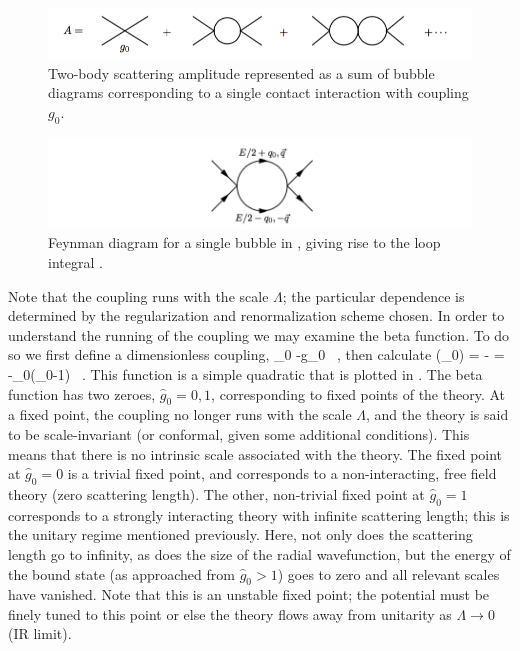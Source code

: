 \begin{figure}
\caption{\label{fig:bubblesum}Two-body scattering amplitude represented as a sum of bubble diagrams corresponding to a single contact interaction with coupling $g_0$.}
\includegraphics[width=\linewidth]{Chapter5-figures/simple1}
\end{figure}

\begin{figure}
\caption{\label{fig:loop}Feynman diagram for a single bubble in , giving rise to the loop integral .}
\includegraphics[width=\linewidth]{Chapter5-figures/loop1}
\end{figure}

Note that the coupling runs with the scale $\Lambda$; the particular dependence is determined by the regularization and renormalization scheme chosen. In order to understand the running of the coupling we may examine the beta function. To do so we first define a dimensionless coupling,
\beq
{}_0 \equiv -g_0 \ ,
\eeq
then calculate
\beq
\label{eq:beta}
\beta\left(_0\right) \equiv \Lambda {} = - = -_0\left(_0-1\right) \ .
\eeq
This function is a simple quadratic that is plotted in . The beta function has two zeroes, $\hat{g}_0 = 0,1$, corresponding to fixed points of the theory. At a fixed point, the coupling no longer runs with the scale $\Lambda$, and the theory is said to be scale-invariant (or conformal, given some additional conditions). This means that there is no intrinsic scale associated with the theory. The fixed point at $\hat{g}_0=0$ is a trivial fixed point, and corresponds to a non-interacting, free field theory (zero scattering length). The other, non-trivial fixed point at $\hat{g}_0=1$ corresponds to a strongly interacting theory with infinite scattering length; this is the unitary regime mentioned previously. Here, not only does the scattering length go to infinity, as does the size of the radial wavefunction, but the energy of the bound state (as approached from $\hat{g}_0 > 1$) goes to zero and all relevant scales have vanished. Note that this is an unstable fixed point; the potential must be finely tuned to this point or else the theory flows away from unitarity as $\Lambda \to 0$ (IR limit).

